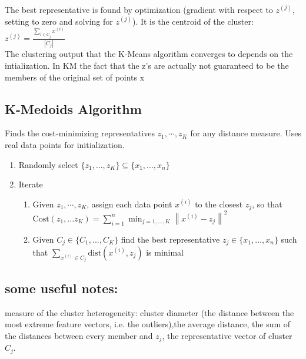 The best representative is found by optimization (gradient with respect to $z^{(j)}$, setting to zero and solving for $z^{(j)}$). It is the centroid of the cluster: $z^{(j)}=\displaystyle \frac{\sum _{i \in C_ j} x^{(i)}}{|C_ j|}$\\

The clustering output that the K-Means algorithm converges to depends on the intialization.
In KM the fact that the z's are actually not guaranteed to be the members of the original set of points x

\subsection{K-Medoids Algorithm}

Finds the cost-minimizing representatives  $z_1,\cdots,z_K$ for any distance measure. Uses real data points for initialization.

\begin{enumerate}
\item Randomly select $\big \{  z_1, ..., z_ K \big \}  \subseteq \big \{  x_1, ..., x_ n \big \}$
\item Iterate
\begin{enumerate}
\item Given $z_1,\cdots,z_K$, assign each data point $x^{(i)}$ to the closest $z_j$, so that $\text {Cost}(z_1, ... z_ K) = \sum _{i=1}^{n} \min _{j=1,...,K} \left\|  x^{(i)} - z_ j \right\| ^2$
\item Given $C_ j \in \big \{ C_1,...,C_ K\big \}$ find the best representative $z_ j \in \big \{ x_1,...,x_ n\big \}$ such that $\sum _{x^{(i)} \in C_ j} \text {dist}(x^{(i)}, z_ j)$ is minimal
\end{enumerate}
\end{enumerate}

\subsection{some useful notes:}
measure of the cluster heterogeneity: cluster diameter (the distance
between the most extreme feature vectors, i.e. the outliers),the average distance,
 the sum of the distances between every member and  $z_j$, the
representative vector of cluster $C_j$.

